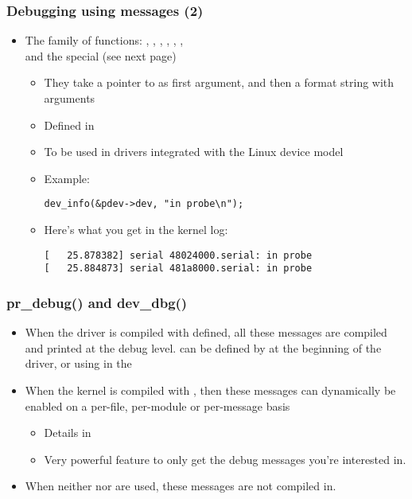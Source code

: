 \begin{frame}[fragile]
  \frametitle{Debugging using messages (2)}
  \begin{itemize}
  \item The  family of functions: ,
    , , ,
    , ,  \\
    and the special  (see next page)
    \begin{itemize}
    \item They take a pointer to  as first
      argument, and then a format string with arguments
    \item Defined in 
    \item To be used in drivers integrated with the Linux device
      model
    \item Example:
      \begin{verbatim}
dev_info(&pdev->dev, "in probe\n");
      \end{verbatim}
    \item Here's what you get in the kernel log:
      \begin{verbatim}
[   25.878382] serial 48024000.serial: in probe
[   25.884873] serial 481a8000.serial: in probe
      \end{verbatim}
    \end{itemize}
  \end{itemize}
\end{frame}

\begin{frame}
  \frametitle{pr\_debug() and dev\_dbg()}
  \begin{itemize}
  \item When the driver is compiled with  defined, all
    these messages are compiled and printed at the debug level.
     can be defined by  at the
    beginning of the driver, or using
     in the 
  \item When the kernel is compiled with ,
    then these messages can dynamically be enabled on a per-file,
    per-module or per-message basis
    \begin{itemize}
    \item Details in 
    \item Very powerful feature to only get the debug messages you're
      interested in.
    \end{itemize}
  \item When neither  nor  are
    used, these messages are not compiled in.
  \end{itemize}
\end{frame}

